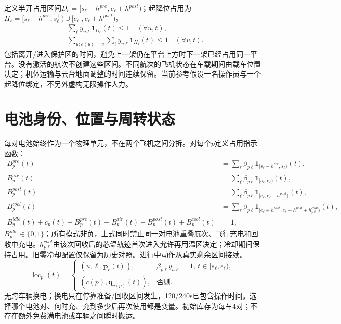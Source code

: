 \noindent 定义半开占用区间$D_\ell=[s_\ell-h^{pre},e_\ell+h^{post})$；起降位占用为$H_\ell=[s_\ell-h^{pre},s_\ell^+)\cup[e_\ell^-,e_\ell+h^{post})$。
\begin{align}
 &\sum_{\ell}y_{u\ell}\mathbf1_{D_\ell}(t)\le1\quad(\forall u,t),\\
 &\sum_{u:c(u)=v}\sum_{\ell}y_{u\ell}\mathbf1_{H_\ell}(t)\le1
                         \quad(\forall v,t).
 \label{eng:eq:pad}
\end{align}
\noindent 包括离开/进入保护区的时间，避免上一架仍在平台上方时下一架已经占用同一平台。没有激活的航次不创建这些区间。不同航次的飞机状态在车载期间由载车位置决定；机体运输与云台地面调整的时间连续保留。当前参考假设一名操作员与一个起降位绑定，不另外虚构无限操作人力。
\clearpage

\section{电池身份、位置与周转状态}
\noindent 每对电池始终作为一个物理单元，不在两个飞机之间分拆。对每个$p$定义占用指示函数：
\begin{align}
 B_p^{pre}(t)&=\sum_\ell\beta_{p\ell}\mathbf1_{[s_\ell-h^{pre},s_\ell)}(t),\\
 B_p^{air}(t)&=\sum_\ell\beta_{p\ell}\mathbf1_{[s_\ell,e_\ell)}(t),\\
 B_p^{post}(t)&=\sum_\ell\beta_{p\ell}\mathbf1_{[e_\ell,e_\ell+h^{post})}(t),\\
 B_p^{cool}(t)&=\sum_\ell\beta_{p\ell}\mathbf1_{[e_\ell+h^{post},e_\ell+h^{post}+h_{p\ell}^{cool})}(t),\\
 B_p^{idle}(t)+c_p(t)+B_p^{pre}(t)+B_p^{air}(t)+B_p^{post}(t)+B_p^{cool}(t)&=1,
 \label{eng:eq:batteryavailability}
\end{align}
\noindent $B_p^{idle}\in\{0,1\}$；所有模式非负，上式同时禁止同一对电池重叠航次、飞行充电和回收中充电。$h_{p\ell}^{cool}$由该次回收后的芯温轨迹首次进入允许再用温区决定；冷却期间保持占用。旧零冷却配置仅保留为历史对照。进行中动作从真实剩余区间接续。
\begin{equation}
 \operatorname{loc}_p(t)=
 \begin{cases}
 (u,\ell,\mathbf p_\ell(t)),&\beta_{p\ell}y_{u\ell}=1,\ t\in[s_\ell,e_\ell),\\
 (c(p),\mathbf q_{c(p)}(t)),&\text{否则}.
 \end{cases}
 \label{eng:eq:batterylocation}
\end{equation}
\noindent 无跨车辆换电；换电只在停靠准备/回收区间发生，120/240s已包含操作时间。选择哪个电池对、何时充、充到多少后再次使用都是变量。初始库存为每车4对；不存在额外免费满电池或车辆之间瞬时搬运。

